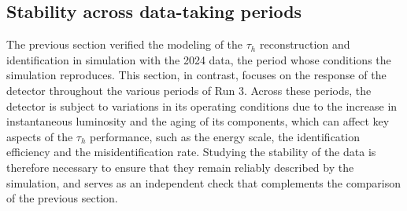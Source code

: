 \subsection{Stability across data-taking periods}
\label{subsec:TES_checks}
%
The previous section verified the modeling of the $\tau_h$ reconstruction and identification in simulation with the 2024 data, the period whose conditions the simulation reproduces. This section, in contrast, focuses on the response of the detector throughout the various periods of Run 3. Across these periods, the detector is subject to variations in its operating conditions due to the increase in instantaneous luminosity and the aging of its components, which can affect key aspects of the $\tau_h$ performance, such as the energy scale, the identification efficiency and the misidentification rate. Studying the stability of the data is therefore necessary to ensure that they remain reliably described by the simulation, and serves as an independent check that complements the comparison of the previous section.

